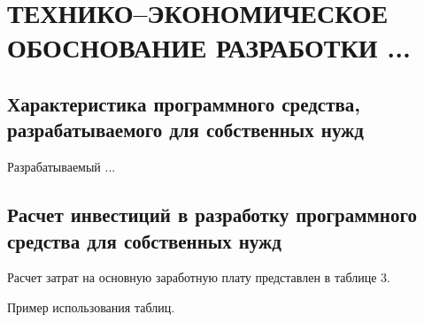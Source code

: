 \chapter[Технико–экономическое обоснование разработки ...]
{ТЕХНИКО–ЭКОНОМИЧЕСКОЕ ОБОСНОВАНИЕ РАЗРАБОТКИ ...}

\section{Характеристика программного средства, разрабатываемого для собственных нужд}\par
\hspace*{12.5 mm}Разрабатываемый ...

\section{Расчет инвестиций в разработку программного средства для собственных нужд}\par
\hspace*{12.5 mm}Расчет затрат на основную заработную плату представлен в 
таблице 3.

Пример использования таблиц.

